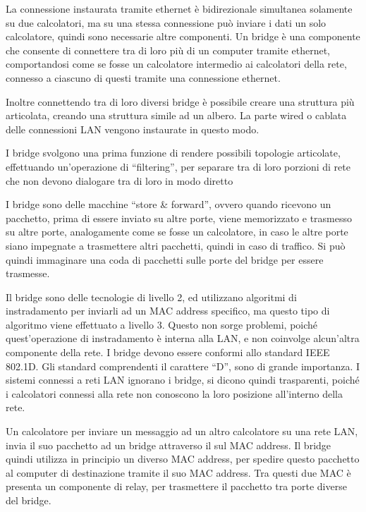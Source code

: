 \documentclass{article}
\numberwithin{equation}{subsection}
\begin{document}
La connessione instaurata tramite ethernet è bidirezionale simultanea solamente su due calcolatori, ma su una stessa connessione può inviare i dati un solo 
calcolatore, quindi sono necessarie altre componenti. Un bridge è una componente che consente di connettere tra di loro più di un computer 
tramite ethernet, comportandosi come se fosse un calcolatore intermedio ai calcolatori della rete, connesso a ciascuno di questi tramite una connessione 
ethernet. 

Inoltre connettendo tra di loro diversi bridge è possibile creare una struttura più articolata, creando una struttura simile ad un albero. La 
parte wired o cablata delle connessioni LAN vengono instaurate in questo modo. 



I bridge svolgono una prima funzione di rendere possibili topologie articolate, effettuando un'operazione di ``filtering'', per separare tra di loro porzioni di rete che 
non devono dialogare tra di loro in modo diretto


I bridge sono delle macchine ``store \& forward'', ovvero quando ricevono un pacchetto, prima di essere inviato su altre porte, viene 
memorizzato e trasmesso su altre porte, analogamente come se fosse un calcolatore, in caso le altre porte siano impegnate a trasmettere altri 
pacchetti, quindi in caso di traffico. Si può quindi immaginare una coda di pacchetti sulle porte del bridge per essere trasmesse. 

Il bridge sono delle tecnologie di livello 2, ed utilizzano algoritmi di instradamento per inviarli ad un MAC address specifico, ma questo tipo di 
algoritmo viene effettuato a livello 3. Questo non sorge problemi, poiché quest'operazione di instradamento è interna alla LAN, e non coinvolge alcun'altra componente 
della rete. I bridge devono essere conformi allo standard IEEE 802.1D. Gli standard comprendenti il carattere ``D'', sono di grande importanza. 
I sistemi connessi a reti LAN ignorano i bridge, si dicono quindi trasparenti, poiché i calcolatori connessi alla rete non conoscono la loro posizione all'interno della 
rete. 


Un calcolatore per inviare un messaggio ad un altro calcolatore su una rete LAN, invia il suo pacchetto ad un bridge attraverso il sul MAC address. Il bridge quindi 
utilizza in principio un diverso MAC address, per spedire questo pacchetto al computer di destinazione tramite il suo MAC address. Tra questi due MAC è presenta un 
componente di relay, per trasmettere il pacchetto tra porte diverse del bridge. 
\end{document}
